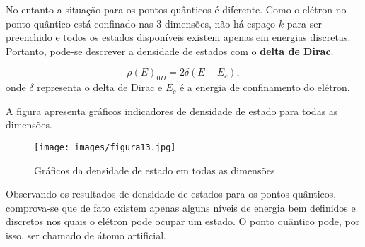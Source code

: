 \par No entanto a situação para os pontos quânticos é diferente. Como o elétron no ponto quântico está confinado nas 3 dimensões, não há espaço $k$ para ser preenchido e todos os estados disponíveis existem apenas em energias discretas. Portanto, pode-se descrever a densidade de estados com o \textbf{delta de Dirac}. 

\begin{equation}
	\label{confinamento_8}
	 \rho(E)_{0D} = 2\delta(E-E_{c}),
\end{equation}
onde $\delta$ representa o delta de Dirac e $E_{c}$ é a energia de confinamento do elétron.

\par A figura  apresenta gráficos indicadores de densidade de estado para todas as dimensões.

\begin{figure}[H]
  \caption{Gráficos da densidade de estado em todas as dimensões\cite{confinamento5}}
  \centering
  \texttt{[image: images/figura13.jpg]}
  \label{fig13}
\end{figure}

\par Observando os resultados de densidade de estados para os pontos quânticos, comprova-se que de fato existem apenas alguns níveis de energia bem definidos e discretos nos quais o elétron pode ocupar um estado. O ponto quântico pode, por isso, ser chamado de átomo artificial. 